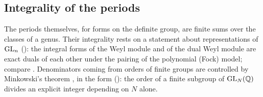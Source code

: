 \subsection{Integrality of the periods}
The periods themselves, for forms on the definite group, are finite sums over the classes of a
genus. Their integrality rests on a statement about representations of $\mathrm{GL}_n$ \lvS{}
(): the integral forms of the Weyl module and of the
dual Weyl module are exact duals of each other under the pairing of the polynomial (Fock)
model; compare \cite{carterlusztig1974}. Denominators coming from orders of finite groups are
controlled by Minkowski's theorem \cite{minkowski1887}, in the form \lvS{}
(): the order of a finite subgroup of $\mathrm{GL}_N(\mathbb{Q})$ divides an
explicit integer depending on $N$ alone.
